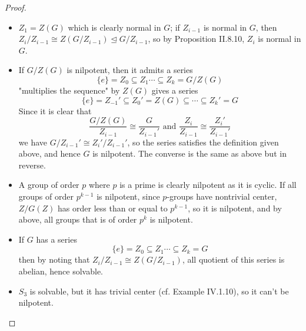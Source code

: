 \begin{proof} \
\begin{itemize}
\setlength\itemsep{0pt}
\item $Z_1 = Z(G)$ which is clearly normal in $G$; if $Z_{i-1}$ is normal in $G$, then $Z_i/Z_{i-1} \cong Z(G/Z_{i-1}) \unlhd G/Z_{i-1}$, so by Proposition II.8.10, $Z_i$ is normal in $G$.
\item If $G/Z(G)$ is nilpotent, then it admits a series
\[
\{e\} = Z_0 \subseteq Z_1 \cdots \subseteq Z_k = G/Z(G) 
\]
"multiplies the sequence" by $Z(G)$ gives a series
\[
\{e\} = Z_{-1}' \subseteq Z_0' = Z(G) \subseteq \cdots \subseteq Z_{k}' = G
\]
Since it is clear that 
\[
\frac{G/Z(G)}{Z_{i-1}} \cong \frac{G}{Z_{i-1}'} \text{ and } \frac{Z_{i}}{Z_{i-1}} \cong \frac{Z_i'}{Z_{i-1}'}	
\]
we have $G/Z_{i-1}' \cong Z_i'/Z_{i-1}'$, so the series satisfies the definition given above, and hence $G$ is nilpotent. The converse is the same as above but in reverse.
\item A group of order $p$ where $p$ is a prime is clearly nilpotent as it is cyclic. If all groups of order $p^{k-1}$ is nilpotent, since $p$-groups have nontrivial center, $Z/G(Z)$ has order less than or equal to $p^{k-1}$, so it is nilpotent, and by above, all groups that is of order $p^k$ is nilpotent.
\item If $G$ has a series
\[
\{e\} = Z_0 \subseteq Z_1 \cdots \subseteq Z_k = G 
\]
then by noting that $Z_i/Z_{i-1} \cong Z(G/Z_{i-1})$, all quotient of this series is abelian, hence solvable.
\item $S_3$ is solvable, but it has trivial center (cf. Example IV.1.10), so it can't be nilpotent.	
\end{itemize}
\end{proof}

